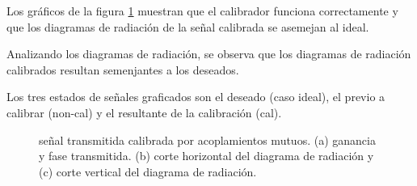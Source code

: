 Los gráficos de la figura \ref{fig:compErrMutual0deg} muestran que el calibrador funciona correctamente y que los diagramas de 
radiación de la señal calibrada se asemejan al ideal. 

Analizando los diagramas de radiación, se observa que los diagramas de radiación calibrados resultan semenjantes a los deseados. 

Los tres estados de señales graficados son el deseado (caso ideal), el previo a calibrar (non-cal) y el resultante de la
calibración (cal).
\begin{figure}[H]
	\centering

	\caption{señal transmitida calibrada por acoplamientos mutuos. (a) ganancia y fase transmitida. (b) corte horizontal del 
	diagrama de radiación y (c) corte vertical del diagrama de radiación.}
	\label{fig:compErrMutual0deg}
\end{figure}

